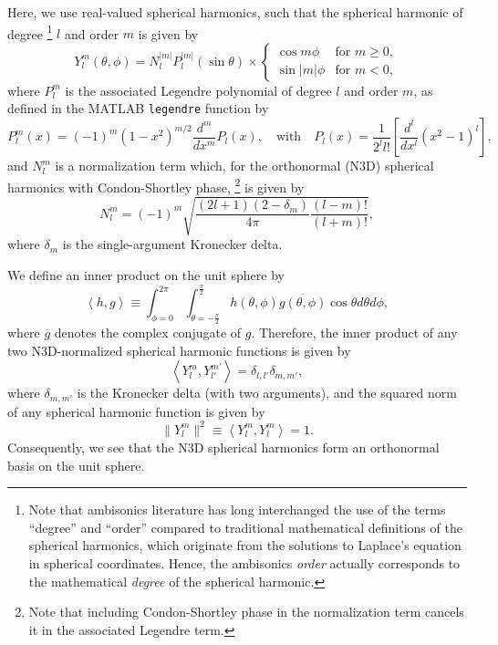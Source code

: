 Here, we use real-valued spherical harmonics, such that the spherical harmonic of degree%
\footnote{Note that ambisonics literature has long interchanged the use of the terms ``degree'' and ``order'' compared to traditional mathematical definitions of the spherical harmonics, which originate from the solutions to Laplace's equation in spherical coordinates.
Hence, the ambisonics \textit{order} actually corresponds to the mathematical \textit{degree} of the spherical harmonic.}
$l$ and order $m$ is given by~\citet[section~2.2]{Zotter2009PhD}
\begin{equation}\label{eq:02_Acoustical_Theory:Spherical_Harmonic}
Y_l^m(\theta,\phi) = N_l^{|m|} P_l^{|m|} (\sin \theta) \times
    \begin{cases}
	\cos m \phi & \textrm{for } m \geq 0,\\
	\sin |m| \phi & \textrm{for } m < 0,
    \end{cases}
\end{equation}
where $P_l^m$ is the associated Legendre polynomial of degree $l$ and order $m$, as defined in the MATLAB \texttt{legendre} function by
\begin{equation}
P_l^m(x) = (-1)^m (1 - x^2)^{m/2} \frac{d^m}{dx^m} P_l(x), \quad
\textrm{with} \quad
P_l(x) = \frac{1}{2^l l!} \left[ \frac{d^l}{dx^l}(x^2 - 1)^l \right],
\end{equation}
and $N_l^m$ is a normalization term which, for the orthonormal (N3D) spherical harmonics with Condon-Shortley phase,%
\footnote{Note that including Condon-Shortley phase in the normalization term cancels it in the associated Legendre term.} is given by
\begin{equation}\label{eq:02_Acoustical_Theory:Spherical_Harmonic_N3D_Normalization}
N_l^m = (-1)^m \sqrt{\frac{(2l+1)(2 - \delta_m)}{4 \pi} \frac{(l-m)!}{(l+m)!}},
\end{equation}
where $\delta_m$ is the single-argument Kronecker delta.

We define an inner product on the unit sphere by
\begin{equation}
\left< h, g \right> \equiv \int_{\phi=0}^{2 \pi} \int_{\theta=-\frac{\pi}{2}}^{\frac{\pi}{2}} h(\theta,\phi) \overline{g(\theta,\phi)} \cos \theta d\theta d\phi,
\end{equation}
where $\overline{g}$ denotes the complex conjugate of $g$.
Therefore, the inner product of any two N3D-normalized spherical harmonic functions is given by
\begin{equation}
\left< Y_l^m, Y_{l'}^{m'} \right> = \delta_{l,l'} \delta_{m,m'},
\end{equation}
where $\delta_{m,m'}$ is the Kronecker delta (with two arguments),
and the squared norm of any spherical harmonic function is given by
\begin{equation}
\|Y_l^m\|^2 \equiv \left< Y_l^m, Y_l^m \right> = 1.
\end{equation} %
Consequently, we see that the N3D spherical harmonics form an orthonormal basis on the unit sphere.

